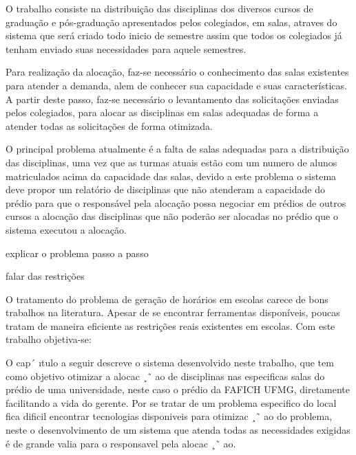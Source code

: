 \sumario
{}

\iniciocapitulo

O trabalho consiste na distribuição das disciplinas dos diversos cursos de graduação e pós-graduação apresentados pelos colegiados, em salas, atraves do sistema que será criado todo inicio de semestre assim que todos os colegiados já tenham enviado suas necessidades para aquele semestres.\par

Para realização da alocação, faz-se necessário o conhecimento das salas existentes para atender a demanda, alem de conhecer sua capacidade e suas características. A partir deste passo, faz-se necessário o levantamento das solicitações enviadas pelos colegiados, para alocar as disciplinas em salas adequadas de forma a atender todas as solicitações de forma otimizada.\par

O principal problema atualmente é a falta de salas adequadas para a distribuição das disciplinas, uma vez que as turmas atuais estão com um numero de alunos matriculados acima da capacidade das salas, devido a este problema o sistema deve propor um relatório de disciplinas que não atenderam a capacidade do prédio para que o responsável pela alocação possa negociar em prédios de outros cursos a alocação das disciplinas que não poderão ser alocadas no prédio que o sistema executou a alocação.\par



explicar o problema passo a passo

falar das restrições





O tratamento do problema de geração de horários em escolas carece de bons
trabalhos na literatura. Apesar de se encontrar ferramentas disponíveis, poucas tratam de
maneira eficiente as restrições reais existentes em escolas. Com este trabalho objetiva-se:


O cap´ ıtulo a seguir descreve o sistema desenvolvido neste trabalho, que tem como objetivo
otimizar a alocac ¸˜ ao de disciplinas nas especificas salas do prédio de uma universidade, neste
caso o prédio da FAFICH UFMG, diretamente facilitando a vida do gerente. Por se tratar de um
problema especifico do local fica dificil encontrar tecnologias disponiveis para otimizac ¸˜ ao do
problema, neste o desenvolvimento de um sistema que atenda todas as necessidades exigidas é
de grande valia para o responsavel pela alocac ¸˜ ao.


